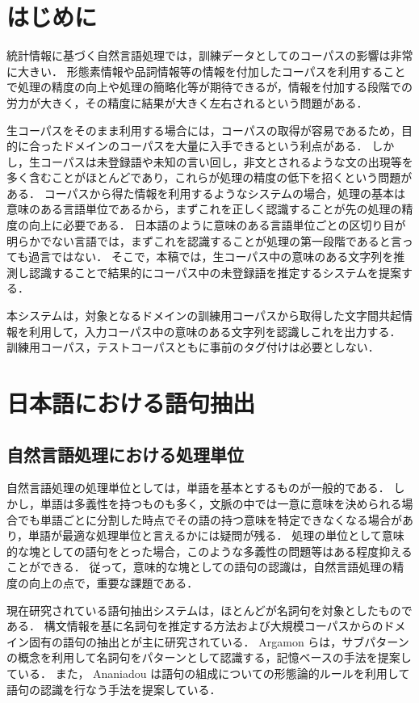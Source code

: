 \maketitle
\section{はじめに}
統計情報に基づく自然言語処理では，訓練データとしてのコーパスの影響は非常に大きい．
形態素情報や品詞情報等の情報を付加したコーパスを利用することで処理の精度の向上や処理の簡略化等が期待できるが，情報を付加する段階での労力が大きく，その精度に結果が大きく左右されるという問題がある．

生コーパスをそのまま利用する場合には，コーパスの取得が容易であるため，目的に合ったドメインのコーパスを大量に入手できるという利点がある．
しかし，生コーパスは未登録語や未知の言い回し，非文とされるような文の出現等を多く含むことがほとんどであり，これらが処理の精度の低下を招くという問題がある．
コーパスから得た情報を利用するようなシステムの場合，処理の基本は意味のある言語単位であるから，まずこれを正しく認識することが先の処理の精度の向上に必要である．
日本語のように意味のある言語単位ごとの区切り目が明らかでない言語では，まずこれを認識することが処理の第一段階であると言っても過言ではない．
そこで，本稿では，生コーパス中の意味のある文字列を推測し認識することで結果的にコーパス中の未登録語を推定するシステムを提案する．

本システムは，対象となるドメインの訓練用コーパスから取得した文字間共起情報を利用して，入力コーパス中の意味のある文字列を認識しこれを出力する．
訓練用コーパス，テストコーパスともに事前のタグ付けは必要としない．
\section{日本語における語句抽出}
\subsection{自然言語処理における処理単位}
自然言語処理の処理単位としては，単語を基本とするものが一般的である．
しかし，単語は多義性を持つものも多く，文脈の中では一意に意味を決められる場合でも単語ごとに分割した時点でその語の持つ意味を特定できなくなる場合があり，単語が最適な処理単位と言えるかには疑問が残る\cite{fung98}．
処理の単位として意味的な塊としての語句をとった場合，このような多義性の問題等はある程度抑えることができる．
従って，意味的な塊としての語句の認識は，自然言語処理の精度の向上の点で，重要な課題である．

現在研究されている語句抽出システムは，ほとんどが名詞句を対象としたものである．
構文情報を基に名詞句を推定する方法および大規模コーパスからのドメイン固有の語句の抽出とが主に研究されている．
Argamon らは，サブパターンの概念を利用して名詞句をパターンとして認識する，記憶ベースの手法を提案している\cite{argamon98}．
また， Ananiadou は語句の組成についての形態論的ルールを利用して語句の認識を行なう手法を提案している\cite{ananiadou94}．
